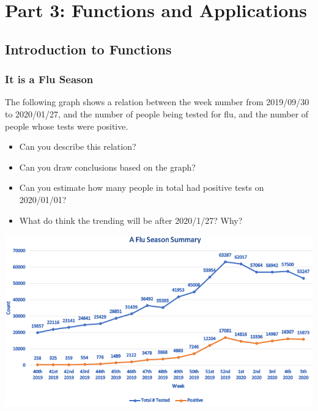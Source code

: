 \documentclass[en,11pt]{elegantbook}
\newcommand{\size}[2]{{\fontsize{#1}{0}\selectfont#2}}
\newenvironment{rmdthink}{
	\vspace*{0.5\baselineskip}
	\par\noindent
	\makebox[-4pt][r]{\color{green!90}\size{12}{\faLightbulbO}\,\,}
    \begin{tcolorbox}[
    enhanced,
    title={\textbf{\color{second}Think}},
    title style={left color=blue!10!green!20!white,right color=yellow!20!blue!20!white},
    colback=green!20!white,
    ]
    \sffamily
}{
    \end{tcolorbox}
	\par\ignorespacesafterend
}
\begin{document}
\hypertarget{part-part-3-functions-and-applications}{%
\part*{Part 3: Functions and Applications}\label{part-part-3-functions-and-applications}}

\hypertarget{introduction-to-functions}{%
\chapter{Introduction to Functions}\label{introduction-to-functions}}

\hypertarget{it-is-a-flu-season}{%
\section{It is a Flu Season}\label{it-is-a-flu-season}}

\begin{rmdthink}

The following graph shows a relation between the week number from 2019/09/30 to 2020/01/27, and the number of people being tested for flu, and the number of people whose tests were positive.

\begin{itemize}

\item
  Can you describe this relation?
\item
  Can you draw conclusions based on the graph?
\item
  Can you estimate how many people in total had positive tests on 2020/01/01?
\item
  What do think the trending will be after 2020/1/27? Why?
\end{itemize}

\begin{center}\includegraphics[width=0.9\linewidth]{figs/flu-season} \end{center}

\end{rmdthink}
\end{document}
